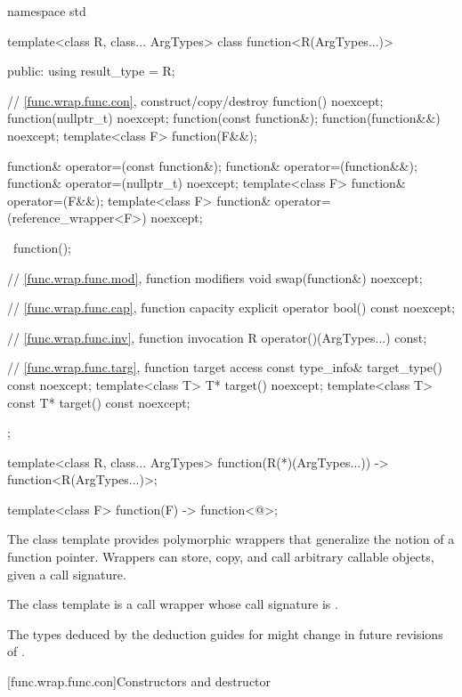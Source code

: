 %
\begin{codeblock}
namespace std {
  template<class R, class... ArgTypes>
  class function<R(ArgTypes...)> {
  public:
    using result_type = R;

    // \ref{func.wrap.func.con}, construct/copy/destroy
    function() noexcept;
    function(nullptr_t) noexcept;
    function(const function&);
    function(function&&) noexcept;
    template<class F> function(F&&);

    function& operator=(const function&);
    function& operator=(function&&);
    function& operator=(nullptr_t) noexcept;
    template<class F> function& operator=(F&&);
    template<class F> function& operator=(reference_wrapper<F>) noexcept;

    ~function();

    // \ref{func.wrap.func.mod}, function modifiers
    void swap(function&) noexcept;

    // \ref{func.wrap.func.cap}, function capacity
    explicit operator bool() const noexcept;

    // \ref{func.wrap.func.inv}, function invocation
    R operator()(ArgTypes...) const;

    // \ref{func.wrap.func.targ}, function target access
    const type_info& target_type() const noexcept;
    template<class T>       T* target() noexcept;
    template<class T> const T* target() const noexcept;
  };

  template<class R, class... ArgTypes>
    function(R(*)(ArgTypes...)) -> function<R(ArgTypes...)>;

  template<class F> function(F) -> function<@\seebelow@>;
}
\end{codeblock}

\pnum
The  class template provides polymorphic wrappers that
generalize the notion of a function pointer. Wrappers can store, copy,
and call arbitrary callable objects, given a call
signature.

\pnum
The  class template is a call
wrapper whose call signature
is .

\pnum
\begin{note}
The types deduced by the deduction guides for 
might change in future revisions of \Cpp{}.
\end{note}

[func.wrap.func.con]{Constructors and destructor}

